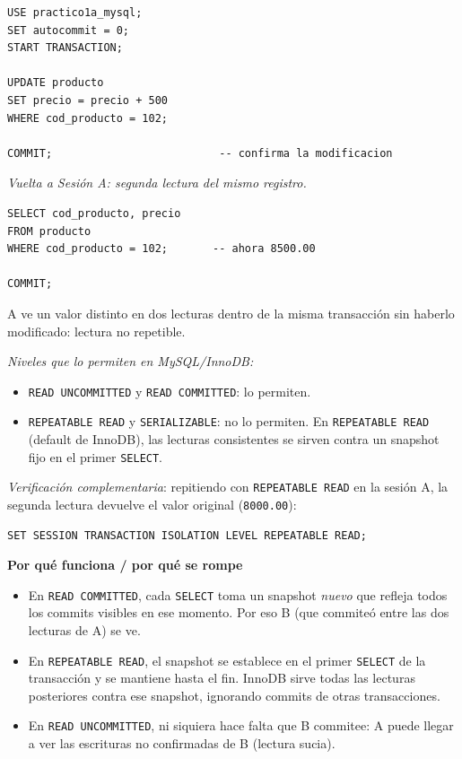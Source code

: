 \documentclass[11pt,a4paper]{article}
\newcommand{\itemcabecera}[1]{\noindent\textbf{#1}\par\medskip}
\newcommand{\bloquePorque}{\itemcabecera{Por qu\'e funciona / por qu\'e se rompe}}
\begin{document}
\begin{lstlisting}
USE practico1a_mysql;
SET autocommit = 0;
START TRANSACTION;

UPDATE producto
SET precio = precio + 500
WHERE cod_producto = 102;

COMMIT;                          -- confirma la modificacion
\end{lstlisting}

\textit{Vuelta a Sesión A: segunda lectura del mismo registro.}

\begin{lstlisting}
SELECT cod_producto, precio
FROM producto
WHERE cod_producto = 102;       -- ahora 8500.00

COMMIT;
\end{lstlisting}

A ve un valor distinto en dos lecturas dentro de la misma transacción sin haberlo modificado: lectura no repetible.

\textit{Niveles que lo permiten en MySQL/InnoDB:}

\begin{itemize}
    \item \texttt{READ UNCOMMITTED} y \texttt{READ COMMITTED}: lo permiten.
    \item \texttt{REPEATABLE READ} y \texttt{SERIALIZABLE}: no lo permiten. En \texttt{REPEATABLE READ} (default de InnoDB), las lecturas consistentes se sirven contra un snapshot fijo en el primer \texttt{SELECT}.
\end{itemize}

\textit{Verificación complementaria}: repitiendo con \texttt{REPEATABLE READ} en la sesión A, la segunda lectura devuelve el valor original (\texttt{8000.00}):

\begin{lstlisting}
SET SESSION TRANSACTION ISOLATION LEVEL REPEATABLE READ;
\end{lstlisting}

\bloquePorque

\begin{itemize}
    \item En \texttt{READ COMMITTED}, cada \texttt{SELECT} toma un snapshot \emph{nuevo} que refleja todos los commits visibles en ese momento. Por eso B (que commiteó entre las dos lecturas de A) se ve.
    \item En \texttt{REPEATABLE READ}, el snapshot se establece en el primer \texttt{SELECT} de la transacción y se mantiene hasta el fin. InnoDB sirve todas las lecturas posteriores contra ese snapshot, ignorando commits de otras transacciones.
    \item En \texttt{READ UNCOMMITTED}, ni siquiera hace falta que B commitee: A puede llegar a ver las escrituras no confirmadas de B (lectura sucia).
\end{itemize}
\end{document}
